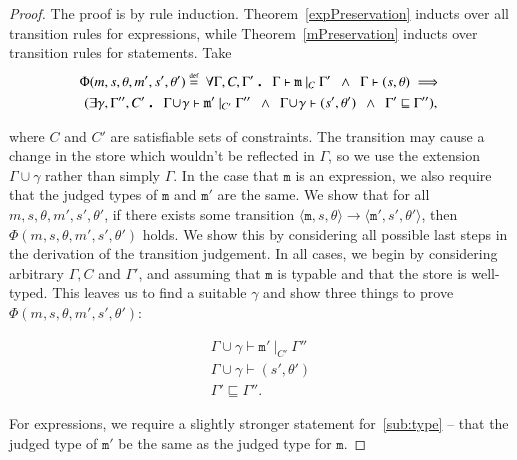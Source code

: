 \documentclass[12pt,a4paper,twoside,openright]{report}
\theoremstyle{definition}
\theoremstyle{dotless}
\newcommand{\transition}[6]{\langle{}\mathtt{#1},#2,#3\rangle{}\rightarrow{}\langle{}\mathtt{#4},#5,#6\rangle}
\newcommand\eqdef{\mathrel{\overset{\makebox[0pt]{\mbox{\normalfont\tiny def}}}{=}}}
\newcommand\qdot{\mathbin{\scalebox{1.5}{.}}\enspace}
\begin{document}
\begin{proof}
  The proof is by rule induction. Theorem~\ref{expPreservation} inducts over all
  transition rules for expressions, while Theorem~\ref{mPreservation} inducts over
  transition rules for statements. Take 
  \begin{multline*}
 	\Phi(m, s, \theta, m', s', \theta') \eqdef 
	\	\forall\Gamma,C,\Gamma' \qdot
	\Gamma\vdash\mathtt{m}\ |_C\ \Gamma' 
	\enspace\land\enspace\Gamma\vdash (s,\theta)
	\implies \\
   	(\exists\gamma,\Gamma'',C'\qdot
    \Gamma\!\cup\!\gamma\vdash \mathtt{m'}\ |_{C'}\ \Gamma'' 
	\enspace\land\enspace\Gamma\!\cup\!\gamma\vdash (s',\theta')
	\enspace\land\enspace \Gamma'\sqsubseteq\Gamma''),
  \end{multline*} 

  where $C$ and $C'$ are satisfiable sets of constraints. The transition may
  cause a change in the store which wouldn't be reflected in $\Gamma$, so we
  use the extension $\Gamma\!\cup\!\gamma$ rather than simply $\Gamma$. In the
  case that $\mathtt{m}$ is an expression, we also require that the judged
  types of $\mathtt{m}$ and $\mathtt{m'}$ are the same. We show that for all
  $m, s, \theta, m', s', \theta'$, if there exists some transition
  $\transition{m}{s}{\theta}{m'}{s'}{\theta'}$, then
  $\Phi(m,s,\theta,m',s',\theta')$ holds. We show this by considering all
  possible last steps in the derivation of the transition judgement. In all
  cases, we begin by considering arbitrary $\Gamma, C$ and $\Gamma'$, and
  assuming that $\mathtt{m}$ is typable and that the store is well-typed. This leaves us to find
  a suitable $\gamma$ and show three things to prove $\Phi(m,s,\theta,m',s',\theta')$:

  \begin{gather}
	\Gamma\!\cup\!\gamma\vdash\mathtt{m'}\ |_{C'}\ \Gamma'' \label{sub:type}\\
	\Gamma\!\cup\!\gamma\vdash(s',\theta') \label{sub:store} \\
	\Gamma' \sqsubseteq \Gamma'' \label{sub:env}.
  \end{gather}

  For expressions, we require a slightly stronger statement for~\eqref{sub:type} -- that
  the judged type of $\mathtt{m'}$ be the same as the judged type for $\mathtt{m}$.


\end{proof}
\end{document}
